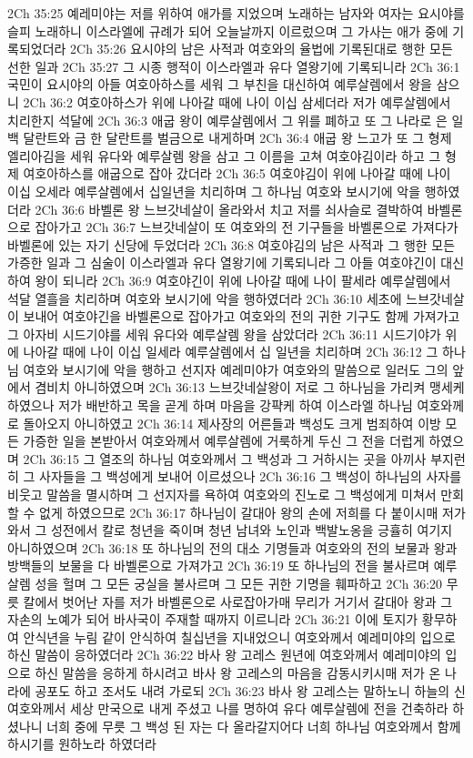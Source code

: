 2Ch 35:25  예레미야는 저를 위하여 애가를 지었으며 노래하는 남자와 여자는 요시야를 슬피 노래하니 이스라엘에 규례가 되어 오늘날까지 이르렀으며 그 가사는 애가 중에 기록되었더라
2Ch 35:26  요시야의 남은 사적과 여호와의 율법에 기록된대로 행한 모든 선한 일과
2Ch 35:27  그 시종 행적이 이스라엘과 유다 열왕기에 기록되니라
2Ch 36:1  국민이 요시야의 아들 여호아하스를 세워 그 부친을 대신하여 예루살렘에서 왕을 삼으니
2Ch 36:2  여호아하스가 위에 나아갈 때에 나이 이십 삼세더라 저가 예루살렘에서 치리한지 석달에
2Ch 36:3  애굽 왕이 예루살렘에서 그 위를 폐하고 또 그 나라로 은 일백 달란트와 금 한 달란트를 벌금으로 내게하며
2Ch 36:4  애굽 왕 느고가 또 그 형제 엘리아김을 세워 유다와 예루살렘 왕을 삼고 그 이름을 고쳐 여호야김이라 하고 그 형제 여호아하스를 애굽으로 잡아 갔더라
2Ch 36:5  여호야김이 위에 나아갈 때에 나이 이십 오세라 예루살렘에서 십일년을 치리하며 그 하나님 여호와 보시기에 악을 행하였더라
2Ch 36:6  바벨론 왕 느브갓네살이 올라와서 치고 저를 쇠사슬로 결박하여 바벨론으로 잡아가고
2Ch 36:7  느브갓네살이 또 여호와의 전 기구들을 바벨론으로 가져다가 바벨론에 있는 자기 신당에 두었더라
2Ch 36:8  여호야김의 남은 사적과 그 행한 모든 가증한 일과 그 심술이 이스라엘과 유다 열왕기에 기록되니라 그 아들 여호야긴이 대신하여 왕이 되니라
2Ch 36:9  여호야긴이 위에 나아갈 때에 나이 팔세라 예루살렘에서 석달 열흘을 치리하며 여호와 보시기에 악을 행하였더라
2Ch 36:10  세초에 느브갓네살이 보내어 여호야긴을 바벨론으로 잡아가고 여호와의 전의 귀한 기구도 함께 가져가고 그 아자비 시드기야를 세워 유다와 예루살렘 왕을 삼았더라
2Ch 36:11  시드기야가 위에 나아갈 때에 나이 이십 일세라 예루살렘에서 십 일년을 치리하며
2Ch 36:12  그 하나님 여호와 보시기에 악을 행하고 선지자 예레미야가 여호와의 말씀으로 일러도 그의 앞에서 겸비치 아니하였으며
2Ch 36:13  느브갓네살왕이 저로 그 하나님을 가리켜 맹세케 하였으나 저가 배반하고 목을 곧게 하며 마음을 강퍅케 하여 이스라엘 하나님 여호와께로 돌아오지 아니하였고
2Ch 36:14  제사장의 어른들과 백성도 크게 범죄하여 이방 모든 가증한 일을 본받아서 여호와께서 예루살렘에 거룩하게 두신 그 전을 더럽게 하였으며
2Ch 36:15  그 열조의 하나님 여호와께서 그 백성과 그 거하시는 곳을 아끼사 부지런히 그 사자들을 그 백성에게 보내어 이르셨으나
2Ch 36:16  그 백성이 하나님의 사자를 비웃고 말씀을 멸시하며 그 선지자를 욕하여 여호와의 진노로 그 백성에게 미쳐서 만회할 수 없게 하였으므로
2Ch 36:17  하나님이 갈대아 왕의 손에 저희를 다 붙이시매 저가 와서 그 성전에서 칼로 청년을 죽이며 청년 남녀와 노인과 백발노옹을 긍휼히 여기지 아니하였으며
2Ch 36:18  또 하나님의 전의 대소 기명들과 여호와의 전의 보물과 왕과 방백들의 보물을 다 바벨론으로 가져가고
2Ch 36:19  또 하나님의 전을 불사르며 예루살렘 성을 헐며 그 모든 궁실을 불사르며 그 모든 귀한 기명을 훼파하고
2Ch 36:20  무릇 칼에서 벗어난 자를 저가 바벨론으로 사로잡아가매 무리가 거기서 갈대아 왕과 그 자손의 노예가 되어 바사국이 주재할 때까지 이르니라
2Ch 36:21  이에 토지가 황무하여 안식년을 누림 같이 안식하여 칠십년을 지내었으니 여호와께서 예레미야의 입으로 하신 말씀이 응하였더라
2Ch 36:22  바사 왕 고레스 원년에 여호와께서 예레미야의 입으로 하신 말씀을 응하게 하시려고 바사 왕 고레스의 마음을 감동시키시매 저가 온 나라에 공포도 하고 조서도 내려 가로되
2Ch 36:23  바사 왕 고레스는 말하노니 하늘의 신 여호와께서 세상 만국으로 내게 주셨고 나를 명하여 유다 예루살렘에 전을 건축하라 하셨나니 너희 중에 무릇 그 백성 된 자는 다 올라갈지어다 너희 하나님 여호와께서 함께하시기를 원하노라 하였더라


